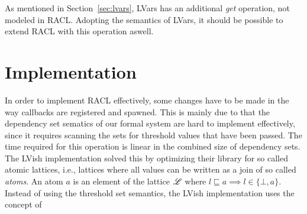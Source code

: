 As mentioned in Section~\ref{sec:lvars}, LVars has an additional \emph{get}
operation, not modeled in RACL. Adopting the semantics of LVars, it should be
possible to extend RACL with this operation aswell.


\section{Implementation}%
\label{sec:implementation}

In order to implement RACL effectively, some changes have to be made in the way
callbacks are registered and spawned. This is mainly due to that the dependency
set sematics of our formal system are hard to implement effectively, since it
requires scanning the sets for threshold values that have been passed. The time
required for this operation is linear in the combined size of dependency sets.
The LVish implementation solved this by optimizing their library for so called
atomic lattices, i.e., lattices where all values can be written as a join of so
called \emph{atoms}. An atom $a$ is an element of the lattice $\mbox{$\mathscr{L}$}$ where
$l \sqsubseteq a \implies l \in \{\bot, a\}$. Instead of using the threshold set
semantics, the LVish implementation uses the concept of






